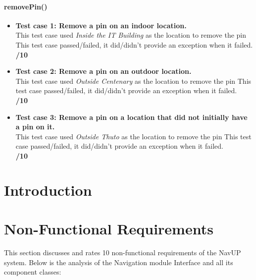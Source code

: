 \documentclass[runningheads,a4paper]{article}
\begin{document}
	\paragraph{removePin()}
		\begin{itemize}
			\item \textbf{Test case 1: Remove a pin on an indoor location.} \\
				This test case used \textit{Inside the IT Building} as the location to remove the pin
				This test case passed/failed, it did/didn't provide an exception when it failed.
			\\ \textbf{/10}
			\item \textbf{Test case 2: Remove a pin on an outdoor location.} \\
				This test case used \textit{Outside Centenary} as the location to remove the pin
				This test case passed/failed, it did/didn't provide an exception when it failed.
			\\ \textbf{/10}
			\item \textbf{Test case 3: Remove a pin on a location that did not initially have a pin on it.} \\
				This test case used \textit{Outside Thuto} as the location to remove the pin
				This test case passed/failed, it did/didn't provide an exception when it failed.
			\\ \textbf{/10}

		\end{itemize}
	
\newpage

\section{Introduction}

	\section{Non-Functional Requirements}
	
	This section discusses and rates 10 non-functional requirements of the NavUP system.
	Below is the analysis of the Navigation module Interface and all its component classes:
	
\end{document}
